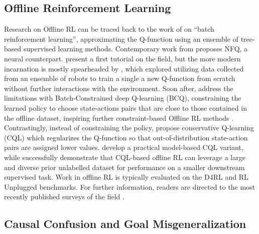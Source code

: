 \documentclass[../thesis-proposal/main.tex]{subfiles}
\begin{document}
\subsection{Offline Reinforcement Learning}

Research on Offline RL can be traced back to the work of \citet{ernst_tree-based_2005} on ``batch
reinforcement learning'', approximating the Q-function using an ensemble of tree-based supervised
learning methods. Contemporary work from \citet{riedmiller_neural_2005} proposes NFQ, a neural
counterpart.  present a first tutorial on the field, but the more modern
incarnation is mostly spearheaded by \citet{kalashnikov_scalable_2018}, which explored utilizing
data collected from an ensemble of robots to train a single a new Q-function from scratch without
further interactions with the environment. Soon after, \citet{fujimoto_off-policy_2019} address the
limitations with Batch-Constrained deep Q-learning (BCQ), constraining the learned policy to choose
state-actions pairs that are close to those contained in the offline dataset, inspiring further
constraint-based Offline RL methods \citep{kumar_stabilizing_2019, xu_offline_2021}. Contrastingly,
instead of constraining the policy, \citet{kumar_conservative_2020} propose conservative Q-learning
(CQL) which regularizes the Q-function so that out-of-distribution state-action pairs are assigned
lower values.  develop a practical model-based CQL variant, while
\citet{singh_cog_2020} successfully demonstrate that CQL-based offline RL can leverage a large and
diverse prior unlabelled dataset for performance on a smaller downstream supervised task. Work in
offline RL is typically evaluated on the D4RL \citep{fu_d4rl_2021} and RL Unplugged
\citep{gulcehre_rl_2020} benchmarks. For further information, readers are directed to the most
recently published surveys of the field \citep{levine_offline_2020, prudencio_survey_2022}.

\subsection{Causal Confusion and Goal Misgeneralization} 
\end{document}
